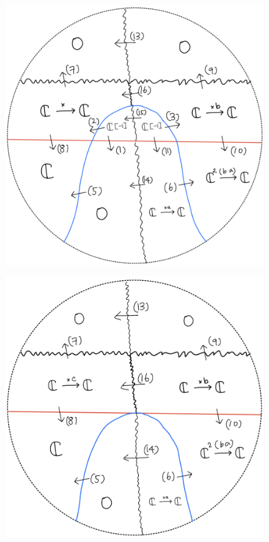 \begin{figure}[H]
    \centering
    \includegraphics[scale = 0.45]{diagrams/cobord'2/42.png} 
    \caption{}
    \label{fig:your-label}
\end{figure}
\begin{figure}[H]
    \centering
    \includegraphics[scale = 0.45]{diagrams/cobord'2/43.png} 
    \caption{}
    \label{fig:your-label}
\end{figure}
